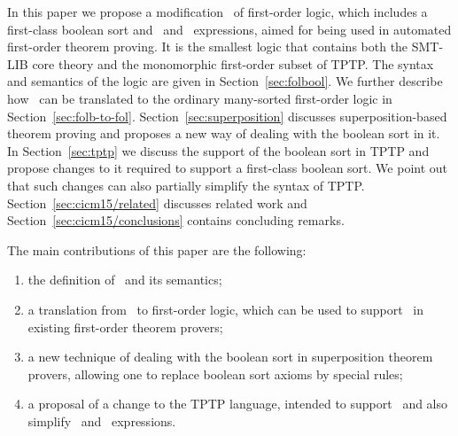 In this paper we propose a modification \folb\ of first-order logic, which includes a first-class boolean sort and \ITE\ and \LETIN\ expressions, aimed for being used in automated first-order theorem proving. It is the smallest logic that contains both the SMT-LIB core theory and the monomorphic first-order subset of TPTP. The syntax and semantics of the logic are given in Section~\ref{sec:folbool}.
We further describe how \folb\ can be translated to the ordinary many-sorted first-order logic in Section~\ref{sec:folb-to-fol}.
Section~\ref{sec:superposition} discusses superposition-based theorem proving and proposes a new way of dealing with the boolean sort in it.
In Section~\ref{sec:tptp} we discuss the support of the boolean sort in TPTP and propose changes to it required to support a first-class boolean sort. We point out that such changes can also partially simplify the syntax of TPTP.
Section~\ref{sec:cicm15/related} discusses related work and Section~\ref{sec:cicm15/conclusions} contains concluding remarks.

The main contributions of this paper are the following:

\begin{enumerate}
\item the definition of \folb\ and its semantics;
\item a translation from \folb\ to first-order logic, which can be used to support \folb\ in existing first-order theorem provers;
\item a new technique of dealing with the boolean sort in superposition theorem provers, allowing one to replace boolean sort axioms by special rules;
\item a proposal of a change to the TPTP language, intended to support \folb\ and also simplify \ITE\ and \LETIN\ expressions.
\end{enumerate}
